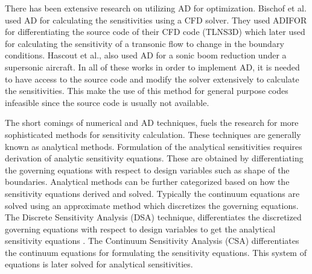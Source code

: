 There has been extensive research on utilizing AD for optimization. Bischof et al. used AD for calculating the sensitivities using a CFD solver. They used ADIFOR for differentiating the source code of their CFD code (TLNS3D) which later used for calculating the sensitivity of a transonic flow to change in the boundary conditions. Hascout et al., also used AD for a sonic boom reduction under a supersonic aircraft. In all of these works in order to implement AD, it is needed to have access to the source code and modify the solver extensively to calculate the sensitivities. This make the use of this method for general purpose codes infeasible since the source code is usually not available.

The short comings of numerical and AD techniques, fuels the research for more sophisticated methods for sensitivity calculation. These techniques are generally known as analytical methods. Formulation of the analytical sensitivities requires derivation of analytic sensitivity equations. These are obtained by differentiating the governing equations with respect to design variables such as shape of the boundaries. Analytical methods can be further categorized based on how the sensitivity equations derived and solved. Typically the continuum equations are solved using an approximate method which discretizes the governing equations. The Discrete Sensitivity Analysis (DSA) technique, differentiates the discretized governing equations with respect to design variables to get the analytical sensitivity equations \cite{choi2006structural}. The Continuum Sensitivity Analysis (CSA) differentiates the continuum equations for formulating the sensitivity equations. This system of equations is later solved for analytical sensitivities.  

